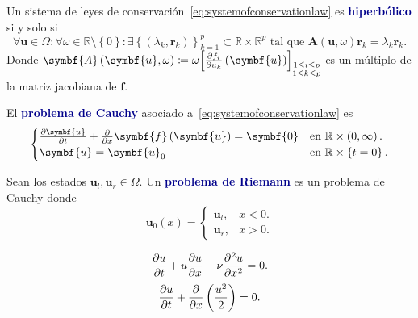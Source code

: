 \begin{definition}
	Un sistema de leyes de
	conservación~\eqref{eq:systemofconservationlaw} es
	\textcolor{DarkBlue}{\bfseries hiperbólico} si y solo si
	\begin{equation}
		\forall\symbf{u}\in\Omega\!:
		\forall\omega\in\mathbb{R}\setminus\left\{0\right\}\!:
		\exists\left\{\left(\lambda_{k},\symbf{r}_{k}\right)\right\}^{p}_{k=1}\subset
		\mathbb{R}\times\mathbb{R}^{p}
		\text{ tal que }
		\symbf{A}\left(\symbf{u},\omega\right)
		\symbf{r}_{k}=
		\lambda_{k}
		\symbf{r}_{k}.
	\end{equation}
	Donde
	\begin{math}
		\symbf{A}\left(\symbf{u},\omega\right)\coloneqq
		\omega
		{
			\begin{bmatrix}
				\diffp{f_{i}}{u_{k}}
				\left(\symbf{u}\right)
			\end{bmatrix}}_{\substack{1\leq i\leq p\\1\leq k\leq p}}
	\end{math}
	es un múltiplo de la matriz jacobiana de $\mathbf{f}$.
\end{definition}

\begin{definition}
	El \textcolor{DarkBlue}{\bfseries problema de Cauchy} asociado
	a~\eqref{eq:systemofconservationlaw} es
	\begin{equation}\label{eq:cauchysystemofconservationlaw}
		\begin{cases}
			\diffp{\symbf{u}}{t}+
			\diffp{}{x}
			\symbf{f}\left(\symbf{u}\right)=
			\symbf{0}               &
			\text{en }\mathbb{R}\times\left(0,\infty\right). \\
			\symbf{u}=\symbf{u}_{0} &
			\text{en }\mathbb{R}\times\left\{t=0\right\}.
		\end{cases}
	\end{equation}
\end{definition}
Sean los estados $\symbf{u}_{l},\symbf{u}_{r}\in\Omega$.
Un \textcolor{DarkBlue}{\bfseries problema de Riemann} es un problema
de Cauchy donde
\begin{equation*}
	\symbf{u}_{0}\left(x\right)=
	\begin{cases}
		\symbf{u}_{l}, & x<0. \\
		\symbf{u}_{r}, & x>0.
	\end{cases}
\end{equation*}

\begin{example}
	\begin{equation*}
		\diffp{u}{t}+
		u\diffp{u}{x}-
		\nu\diffp[2]{u}{x}=
		0.
	\end{equation*}
	\begin{equation*}
		\diffp{u}{t}+
		\diffp{}{x}
		\left(\frac{u^{2}}{2}\right)=
		0.
	\end{equation*}
\end{example}

